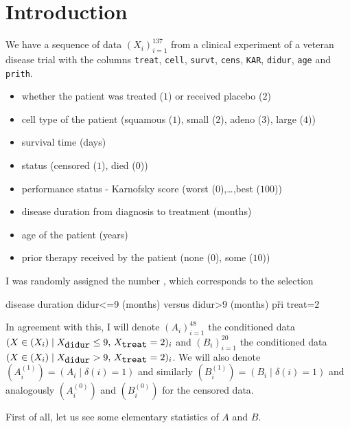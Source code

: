 \section{Introduction}%
\label{sec:introduction}

We have a sequence of data \((X_i)_{i=1}^{137}\) from a clinical experiment of a veteran disease trial with the columns \verb|treat|, \verb|cell|,
\verb|survt|, \verb|cens|, \verb|KAR|, \verb|didur|, \verb|age| and \verb|prith|.

\begin{itemize}
    \item[\texttt{treat}] whether the patient was treated (\(1\)) or received placebo (\(2\))
    \item[\texttt{cell}] cell type of the patient (squamous (\(1\)), small (\(2\)), adeno (\(3\)), large (\(4\)))
    \item[\texttt{survt}] survival time (days)
    \item[\texttt{cens}] status (censored (\(1\)), died (\(0\)))
    \item[\texttt{KAR}]  performance status - Karnofsky score (worst (\(0\)),\dots,best (\(100\)))
    \item[\texttt{didur}] disease duration from diagnosis to treatment (months)
    \item[\texttt{age}]  age of the patient (years)
    \item[\texttt{prith}] prior therapy received by the patient (none (\(0\)), some (\(10\)))
\end{itemize}

I was randomly assigned the number \emph{}, which corresponds to the selection

\begin{codesample}
disease duration didur<=9 (months) versus didur>9 (months) při treat=2
\end{codesample}

In agreement with this, I will denote \((A_i)_{i=1}^{48}\) the conditioned data \((X \in (X_i) \mid X_{\verb|didur|} \le 9, \,
X_{\verb|treat|} = 2)_i\) and \((B_i)_{i=1}^{20}\) the conditioned data \((X \in (X_i) \mid X_{\verb|didur|} > 9, \,
X_{\verb|treat|} = 2)_i\). We will also denote \((A^{(1)}_i) = (A_i \mid \delta(i) = 1)\) and similarly 
\((B^{(1)}_i) = (B_i \mid \delta(i) = 1)\) and analogously \((A^{(0)}_i)\) and 
\((B^{(0)}_i)\) for the censored data.


First of all, let us see some elementary statistics of \(A\) and \(B\).

